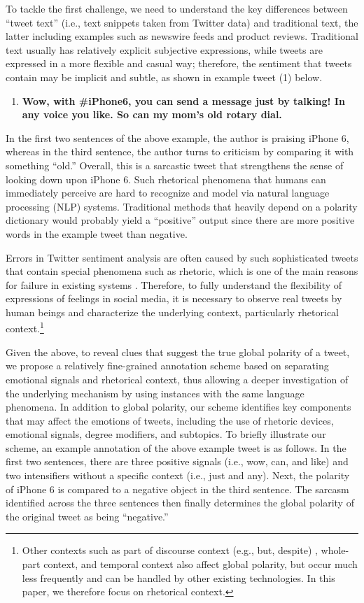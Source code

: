 \documentclass[english]{jnlp_1.4}
\begin{document}
To tackle the first challenge, we need to understand the key differences between ``tweet text'' (i.e., text snippets taken from Twitter data) and traditional text, the latter including examples such as newswire feeds and product reviews. Traditional text usually has relatively explicit subjective expressions, while tweets are expressed in a more flexible and casual way; therefore, the sentiment that tweets contain may be implicit and subtle, as shown in example tweet (1) below.

\begin{enumerate}
\item[\bf (1)] {\bf Wow, with \#iPhone6, you can send a message just by talking! In any voice you like. So can my mom's old rotary dial.}
\end{enumerate}

In the first two sentences of the above example, the author is praising iPhone 6, whereas in the third sentence, the author turns to criticism by comparing it with something ``old.'' Overall, this is a sarcastic tweet that strengthens the sense of looking down upon iPhone 6. Such rhetorical phenomena that humans can immediately perceive are hard to recognize and model via natural language processing (NLP) systems. Traditional methods that heavily depend on a polarity dictionary would probably yield a ``positive'' output since there are more positive words in the example tweet than negative.

Errors in Twitter sentiment analysis are often caused by such sophisticated tweets that contain special phenomena such as rhetoric, which is one of the main reasons for failure in existing systems \cite{Sidorenko13,Xie12,Wiegand10}. Therefore, to fully understand the flexibility of expressions of feelings in social media, it is necessary to observe real tweets by human beings and characterize the underlying context, particularly rhetorical context.\footnote{Other contexts such as part of discourse context (e.g., but, despite) \cite{Mukherjee12}, whole-part context, and temporal context also affect global polarity, but occur much less frequently and can be handled by other existing technologies. In this paper, we therefore focus on rhetorical context.}

Given the above, to reveal clues that suggest the true global polarity of a tweet, we propose a relatively fine-grained annotation scheme based on separating emotional signals and rhetorical context, thus allowing a deeper investigation of the underlying mechanism by using instances with the same language phenomena. In addition to global polarity, our scheme identifies key components that may affect the emotions of tweets, including the use of rhetoric devices, emotional signals, degree modifiers, and subtopics. To briefly illustrate our scheme, an example annotation of the above example tweet is as follows. In the first two sentences, there are three positive signals (i.e., wow, can, and like) and two intensifiers without a specific context (i.e., just and any). Next, the polarity of iPhone 6 is compared to a negative object in the third sentence. The sarcasm identified across the three sentences then finally determines the global polarity of the original tweet as being ``negative.''
\end{document}
